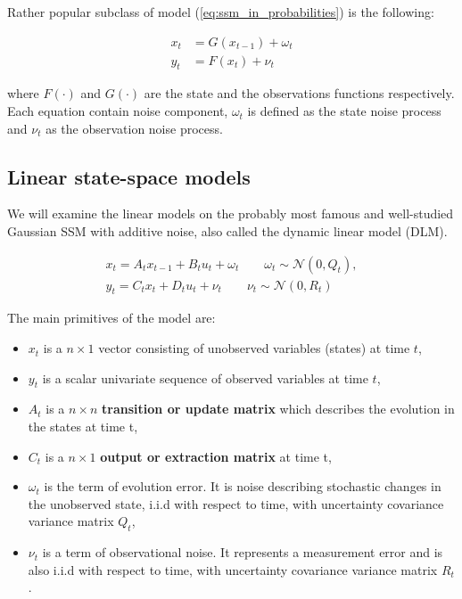 Rather popular subclass of model (\ref{eq:ssm_in_probabilities}) is the following:

\begin{subequations}
\begin{align}
    x_t &= G(x_{t-1}) + \omega_t \\
    y_t &= F(x_t) + \nu_t
\end{align}
\label{eq:ssm_subclass}
\end{subequations}

\noindent where \(F(\cdot)\) and \(G(\cdot)\) are the state and the observations functions respectively. Each equation contain noise component, \(\omega_t\) is defined as the state noise process and \(\nu_t\) as the observation noise process.

\subsection{Linear state-space models}

We will examine the linear models on the probably most famous and well-studied Gaussian SSM with additive noise, also called the dynamic linear model (DLM).

\begin{subequations}
\begin{alignat}{2}
    x_t = A_t x_{t-1} + B_t u_t + \omega_t \qquad \omega_t \sim \mathcal{N}(0, Q_t), \\
    y_t = C_t x_t + D_t u_t +  \nu_t   \qquad \nu_t \sim \mathcal{N}(0, R_t)
\end{alignat}
\label{eq:ssm_gaussian}
\end{subequations}

The main primitives of the model are:
\begin{itemize}
    \item \(x_t\) is a \(n \times 1\) vector consisting of unobserved variables (states) at time \(t\),
    \item \(y_t\) is a scalar univariate sequence of observed variables at time \(t\),
    \item \(A_t\) is a \(n \times n\) \textbf{transition or update matrix} which describes the evolution in the states at time t,
    \item \(C_t\) is a \(n \times 1\) \textbf{output or extraction matrix}  at time t,
    \item \(\omega_t\) is the term of evolution error. It is noise describing stochastic changes in the unobserved state, i.i.d with respect to time, with uncertainty covariance variance matrix \(Q_t\),
    \item \(\nu_t\) is a term of observational noise. It represents a measurement error and is also i.i.d with respect to time, with uncertainty covariance variance matrix \(R_t\).
\end{itemize}

